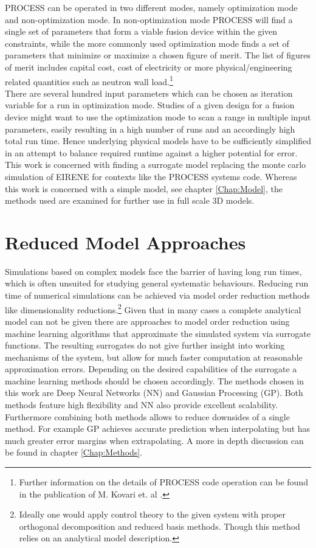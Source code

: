 	PROCESS can be operated in two different modes, namely optimization mode and non-optimization mode. In non-optimization mode PROCESS will find a single set of parameters that form a viable fusion device within the given constraints, while the more commonly used optimization mode finds a set of parameters that minimize or maximize a chosen figure of merit. The list of figures of merit includes capital cost, cost of electricity or more physical/engineering related quantities such as neutron wall load.\footnote{Further information on the details of PROCESS code operation can be found in the publication of M. Kovari et. al \cite{process}.}\\
	There are several hundred input parameters which can be chosen as iteration variable for a run in optimization mode. Studies of a given design for a fusion device might want to use the optimization mode to scan a range in multiple input parameters, easily resulting in a high number of runs and an accordingly high total run time. Hence underlying physical models have to be sufficiently simplified in an attempt to balance required runtime against a higher potential for error.\\
	
	This work is concerned with finding a surrogate model replacing the monte carlo simulation of EIRENE for contexts like the PROCESS systems code. Whereas this work is concerned with a simple model, see chapter \ref{Chap:Model}, the methods used are examined for further use in full scale 3D models.
	
	
	\section{Reduced Model Approaches}
	Simulations based on complex models face the barrier of having long run times, which is often unsuited for studying general systematic behaviours. Reducing run time of numerical simulations can be achieved via model order reduction methods like dimensionality reductions.\footnote{Ideally one would apply control theory to the given system with proper orthogonal decomposition and reduced basis methods. Though this method relies on an analytical model description.}
	Given that in many cases a complete analytical model can not be given there are approaches to model order reduction using machine learning algorithms that approximate the simulated system via surrogate functions. The resulting surrogates do not give further insight into working mechanisms of the system, but allow for much faster computation at reasonable approximation errors. Depending on the desired capabilities of the surrogate a machine learning methods should be chosen accordingly. The methods chosen in this work are Deep Neural Networks (NN) and Gaussian Processing (GP). Both methods feature high flexibility and NN also provide excellent scalability. Furthermore combining both methods allows to reduce downsides of a single method. For example GP achieves accurate prediction when interpolating but has much greater error margins when extrapolating. A more in depth discussion can be found in chapter \ref{Chap:Methods}. 

	